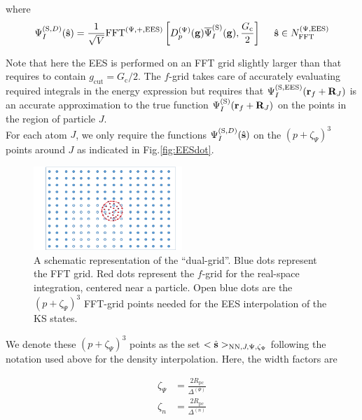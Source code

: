 \documentclass[paper=a4, fontsize=11pt]{article} %
\numberwithin{equation}{section} %
\numberwithin{figure}{section} %
\numberwithin{table}{section} %
\newcommand{\bs}{{\bf{s}}}
\newcommand{\bg}{{\bf{g}}}
\newcommand{\br}{{\bf{r}}}
\newcommand{\bR}{{\bf{R}}}
\newcommand{\hs}{{\hat{\bf{s}}}}
\newcommand{\rS}{{\mathrm{S}}}
\newcommand{\rEES}{{\mathrm{EES}}}
\newcommand{\rcut}{{\mathrm{cut}}}
\newcommand{\rNN}{{\mathrm{NN}}}
\newcommand{\psigs}{{\overline \Psi_I^{(\rS)}(\bg)}}
\newcommand{\NFFTpEES}{{N^{\mathrm{(\Psi,\rEES})}_{\mathrm{FFT}}}}
\newcommand{\Gc}{{G_{\mathrm{c}}}}
\newcommand{\hGc}{{\frac{G_{\mathrm{c}}}{2}}}
\newcommand{\Rpc}{{R_{\mathrm{pc}}}}
\newcommand{\Dpg}{{D^{(\Psi)}_p(\bg)}}
\newcommand{\FFTpEES}{{\mathrm{FFT}^{(\Psi,+,\rEES)}}}
\newcommand{\pzp}{{(p+\zeta_{\Psi})^3}}
\newcommand{\hsJp}{{<\hs>_{\rNN,J,\Psi,\zeta_\Psi}}}
\newcommand{\hsinpEES}{{\ \ \ \ \hs \in \NFFTpEES}}
\begin{document}
where 
\begin{equation}
\begin{split}
\Psi_I^{(\rS,D)}(\hat \bs) &= \frac{1}{\sqrt V} \FFTpEES \left[  \Dpg \psigs,\hGc \right] \hsinpEES \\
\end{split}
\end{equation}

Note that here the EES is performed on an FFT grid slightly larger than that requires to contain $g_\rcut =\Gc/2$. The $f$-grid takes care of accurately evaluating required integrals in the energy expression but requires that $\Psi_I^{(\rS,\rEES)}(\br_f+\bR_J)$ is an accurate approximation to the true function $\Psi_I^{(\rS)}(\br_f+\bR_J)$ on the points in the region of particle $J$.\\

For each atom $J$, we only require the functions $\Psi_I^{(\rS,D)}(\hat \bs)$ on the $\pzp$ points around $J$ as indicated in Fig.\eqref{fig:EESdot}.


\begin{figure}[h!] 
    \centering
    \includegraphics[width=0.5\textwidth]{EESdot}
    \caption{A schematic representation of the ``dual-grid''. Blue dots represent the FFT grid. Red dots represent the $f$-grid for the real-space integration, centered near a particle. Open blue dots are the $\pzp$ FFT-grid points needed for the EES interpolation of the KS states.} 
    \label{fig:EESdot}
\end{figure}


We denote these $\pzp$ points as the set  $\hsJp$ following the notation used above for the density interpolation. Here, the width factors are 

\begin{equation}
\begin{split}
\zeta_{\Psi} &= \frac{2\Rpc}{\Delta^{(\Psi)}}\\
\zeta_{n} &= \frac{2\Rpc}{\Delta^{(n)}}\\
\end{split}
\end{equation}
\end{document}
